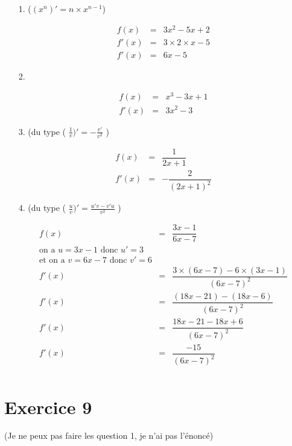 \documentclass[11pt]{article}
\begin{document}
\begin{enumerate}

\item[1.]
  ($(x^n)' = n \times x^{n-1} $)

  \begin{eqnarray*}
    f(x)  &=& 3x^2 - 5x + 2 \\
    f'(x) &=& 3 \times 2 \times x - 5 \\
    f'(x) &=& 6x - 5
  \end{eqnarray*}
  
\item[2.]
  
  \begin{eqnarray*}
    f(x)  &=& x^3 - 3x + 1 \\
    f'(x) &=& 3 x^2 - 3
  \end{eqnarray*}
  
\item[3.]
  (du type ( $\frac{1}{v})' = -\frac{v'}{v^2}$ )
  
  \begin{eqnarray*}
    f(x)  &=& \dfrac{1}{2x + 1} \\
    f'(x) &=& -\dfrac{2}{(2x + 1)^2}
  \end{eqnarray*}
  

  
\item[4.]
  (du type ( $\frac{u}{v})' = \frac{u'v-v'u}{v^2}$ )
  
  \begin{eqnarray*}
    f(x)  &=& \dfrac{3x - 1}{6x - 7} \\
    \text{on a } u = 3x - 1 \text{ donc } u'= 3\\
    \text{et on a } v = 6x - 7 \text{ donc } v'= 6\\
    f'(x) &=& \dfrac{3 \times (6x - 7) - 6 \times (3x - 1)}{(6x-7)^2}\\
    f'(x) &=& \dfrac{(18x - 21) - (18x - 6)}{(6x-7)^2}\\
    f'(x) &=& \dfrac{18x - 21 - 18x + 6}{(6x-7)^2}\\
    f'(x) &=& \dfrac{-15}{(6x-7)^2}\\
  \end{eqnarray*}

\end{enumerate}

\newpage

\section{Exercice 9}
(Je ne peux pas faire les question 1, je n'ai pas l'énoncé)
\end{document}
